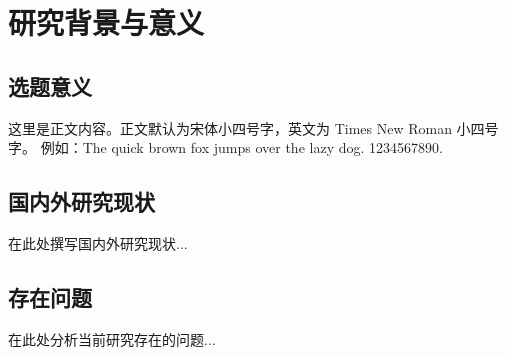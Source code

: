\section{研究背景与意义}

\subsection{选题意义}
这里是正文内容。正文默认为宋体小四号字，英文为 Times New Roman 小四号字。
例如：The quick brown fox jumps over the lazy dog. 1234567890.

\subsection{国内外研究现状}
在此处撰写国内外研究现状...

\subsection{存在问题}
在此处分析当前研究存在的问题...
